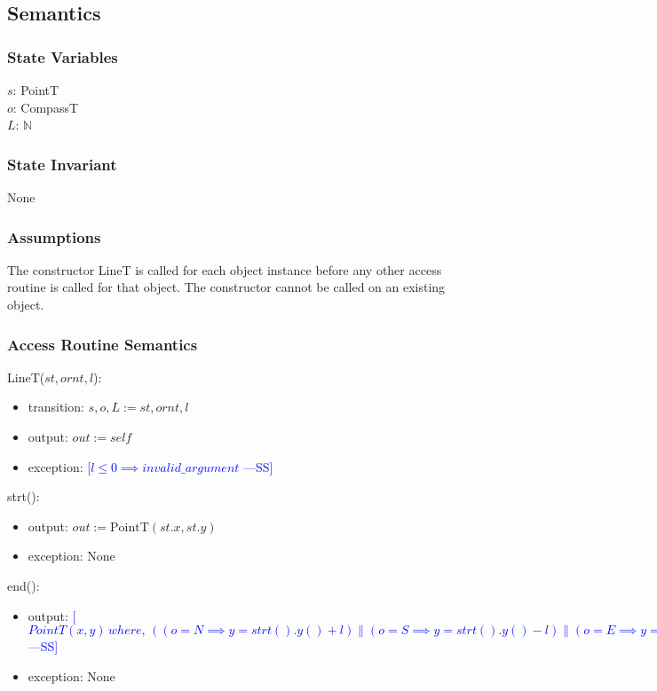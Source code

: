 \documentclass[12pt]{article}
\newcommand{\authornote}[3]{\textcolor{#1}{[#3 ---#2]}}
\newcommand{\authornote}[3]{}
\newcommand{\wss}[1]{\authornote{blue}{SS}{#1}}
\begin{document}
\subsection* {Semantics}

\subsubsection* {State Variables}

$s$: PointT\\
$o$: CompassT\\
$L$: $\mathbb{N}$\\ 

\subsubsection* {State Invariant}

None

\subsubsection* {Assumptions}

The constructor LineT is called for each object instance before any other
access routine is called for that object.  The constructor cannot be called on
an existing object.

\subsubsection* {Access Routine Semantics}

LineT($st, ornt, l$):
\begin{itemize}
\item transition: $s, o, L := st, ornt, l$
\item output: $out := \mathit{self}$
\item exception: \wss{$l \leq 0 \implies invalid\_argument$}
\end{itemize}

\noindent strt():
\begin{itemize}
\item output: $out := \mbox{PointT}(st.x, st.y)$
\item exception: None
\end{itemize}

\noindent end():
\begin{itemize}
\item output: \wss{$PointT(x, y)\, where,\, ( (o = N \implies y = strt().y() + l) \| (o = S \implies y = strt().y() - l) \| (o = E \implies y = strt().x() + l) \| (o = W \implies y = strt().x() - l) )$}

\item exception: None
\end{itemize}
\end{document}
